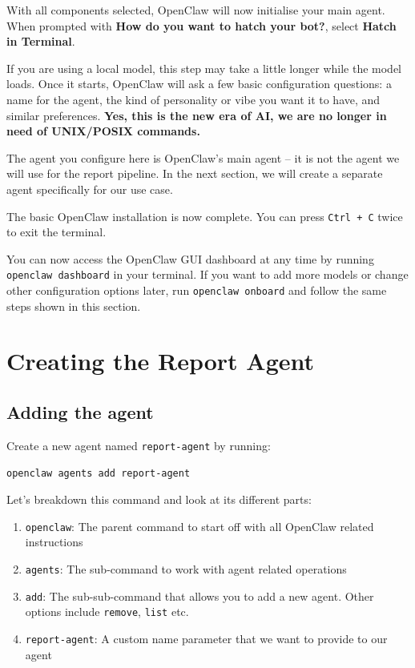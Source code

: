 \documentclass[12pt, a4paper]{article}
\begin{document}
With all components selected, OpenClaw will now initialise your main agent. When prompted with \textbf{How do you want to hatch your bot?}, select \textbf{Hatch in Terminal}.

If you are using a local model, this step may take a little longer while the model loads. Once it starts, OpenClaw will ask a few basic configuration questions: a name for the agent, the kind of personality or vibe you want it to have, and similar preferences. \textbf{Yes, this is the new era of AI, we are no longer in need of UNIX/POSIX commands.}

\begin{notebox}
The agent you configure here is OpenClaw's main agent -- it is not the agent we will use for the report pipeline. In the next section, we will create a separate agent specifically for our use case.
\end{notebox}

The basic OpenClaw installation is now complete. You can press \texttt{Ctrl + C} twice to exit the terminal.

\begin{notebox}
You can now access the OpenClaw GUI dashboard at any time by running \texttt{openclaw dashboard} in your terminal. If you want to add more models or change other configuration options later, run \texttt{openclaw onboard} and follow the same steps shown in this section.
\end{notebox}

\clearpage

\section{Creating the Report Agent}

\subsection{Adding the agent}

Create a new agent named \texttt{report-agent} by running:

\begin{lstlisting}[style=shellstyle]
openclaw agents add report-agent
\end{lstlisting}

Let's breakdown this command and look at its different parts:
\begin{enumerate}
    \item \texttt{openclaw}: The parent command to start off with all OpenClaw related instructions
    \item \texttt{agents}: The sub-command to work with agent related operations
    \item \texttt{add}: The sub-sub-command that allows you to add a new agent. Other options include \texttt{remove}, \texttt{list} etc.
    \item \texttt{report-agent}: A custom name parameter that we want to provide to our agent
\end{enumerate}
\end{document}
